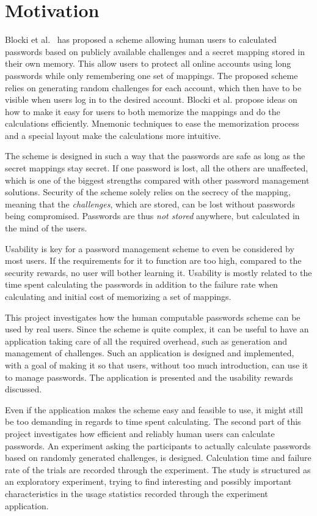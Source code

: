 \section{Motivation}
Blocki et al.~\cite{Blocki2014,hcp-blocki} has proposed a scheme allowing human users to calculated passwords based on publicly available challenges and a secret mapping stored in their own memory. This allow users to protect all online accounts using long passwords while only remembering one set of mappings. The proposed scheme relies on generating random challenges for each account, which then have to be visible when users log in to the desired account. Blocki et al. propose ideas on how to make it easy for users to both memorize the mappings and do the calculations efficiently. Mnemonic techniques to ease the memorization process and a special layout make the calculations more intuitive.
\par The scheme is designed in such a way that the passwords are safe as long as the secret mappings stay secret. If one password is lost, all the others are unaffected, which is one of the biggest strengths compared with other password management solutions. Security of the scheme solely relies on the secrecy of the mapping, meaning that the \emph{challenges}, which are stored, can be lost without passwords being compromised. Passwords are thus \emph{not stored} anywhere, but calculated in the mind of the users. 
\par Usability is key for a password management scheme to even be considered by most users. If the requirements for it to function are too high, compared to the security rewards, no user will bother learning it. Usability is mostly related to the time spent calculating the passwords in addition to the failure rate when calculating and initial cost of memorizing a set of mappings.
\par This project investigates how the human computable passwords scheme can be used by real users. Since the scheme is quite complex, it can be useful to have an application taking care of all the required overhead, such as generation and management of challenges. Such an application is designed and implemented, with a goal of making it so that users, without too much introduction, can use it to manage passwords. The application is presented and the usability rewards discussed.
\par Even if the application makes the scheme easy and feasible to use, it might still be too demanding in regards to time spent calculating. The second part of this project investigates how efficient and reliably human users can calculate passwords. An experiment asking the participants to actually calculate passwords based on randomly generated challenges, is designed. Calculation time and failure rate of the trials are recorded through the experiment. The study is structured as an exploratory experiment, trying to find interesting and possibly important characteristics in the usage statistics recorded through the experiment application.

